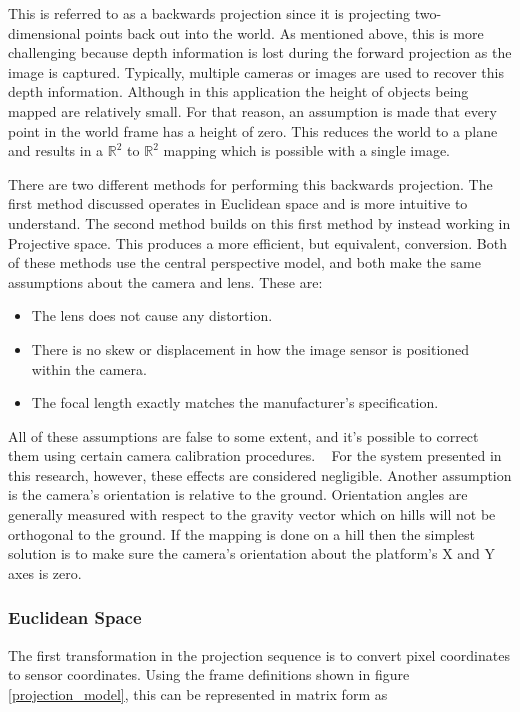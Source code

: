  This is referred to as a backwards projection since it is projecting two-dimensional points back out into the world.  As mentioned above, this is more challenging because depth information is lost during the forward projection as the image is captured.  Typically, multiple cameras or images are used to recover this depth information.  Although in this application the height of objects being mapped are relatively small.  For that reason, an assumption is made that every point in the world frame has a height of zero.  This reduces the world to a plane and results in a $\mathbb{R}^2$ to $\mathbb{R}^2$ mapping which is possible with a single image. 
 
 There are two different methods for performing this backwards projection. The first method discussed operates in Euclidean space and is more intuitive to understand.  The second method builds on this first method by instead working in Projective space.  This produces a more efficient, but equivalent, conversion.  Both of these methods use the central perspective model, and both make the same assumptions about the camera and lens.  These are:
 \begin{itemize}
 \item The lens does not cause any distortion. 
 \item There is no skew or displacement in how the image sensor is positioned within the camera.
 \item The focal length exactly matches the manufacturer's specification.
 \end{itemize}

 All of these assumptions are false to some extent, and it's possible to correct them using certain camera calibration procedures. ~\citep{Zhang:1999} For the system presented in this research, however, these effects are considered negligible.  Another assumption is the camera's orientation is relative to the ground.  Orientation angles are generally measured with respect to the gravity vector which on hills will not be orthogonal to the ground.  If the mapping is done on a hill then the simplest solution is to make sure the camera's orientation about the platform's X and Y axes is zero.
 
 \subsubsection{Euclidean Space}
 
 The first transformation in the projection sequence is to convert pixel coordinates to sensor coordinates.  Using the frame definitions shown in figure \ref{projection_model}, this can be represented in matrix form as 
 
